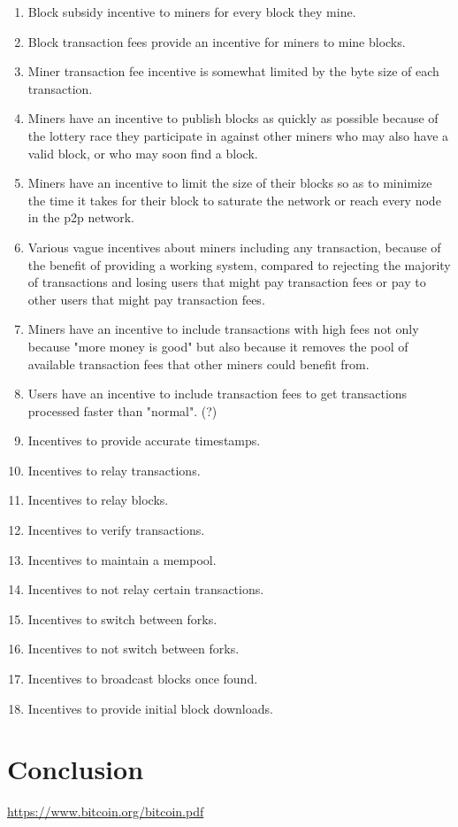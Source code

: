 \documentclass[letterpaper]{article}
\begin{document}
\begin{enumerate}
\item Block subsidy incentive to miners for every block they mine.

\item Block transaction fees provide an incentive for miners to mine blocks.

\item Miner transaction fee incentive is somewhat limited by the byte size of
each transaction.

\item Miners have an incentive to publish blocks as quickly as possible because
of the lottery race they participate in against other miners who may also have
a valid block, or who may soon find a block.

\item Miners have an incentive to limit the size of their blocks so as to
minimize the time it takes for their block to saturate the network or reach
every node in the p2p network.

\item Various vague incentives about miners including any transaction, because
of the benefit of providing a working system, compared to rejecting the
majority of transactions and losing users that might pay transaction fees or
pay to other users that might pay transaction fees.

\item Miners have an incentive to include transactions with high fees not only
because "more money is good" but also because it removes the pool of available
transaction fees that other miners could benefit from.

\item Users have an incentive to include transaction fees to get transactions
processed faster than "normal". (?)

\item Incentives to provide accurate timestamps.

\item Incentives to relay transactions.

\item Incentives to relay blocks.

\item Incentives to verify transactions.

\item Incentives to maintain a mempool.

\item Incentives to not relay certain transactions.

\item Incentives to switch between forks.

\item Incentives to not switch between forks.

\item Incentives to broadcast blocks once found.

\item Incentives to provide initial block downloads.

\end{enumerate}

\section{Conclusion}

\begin{thebibliography}
 \url{https://www.bitcoin.org/bitcoin.pdf}
\end{thebibliography}
\end{document}
